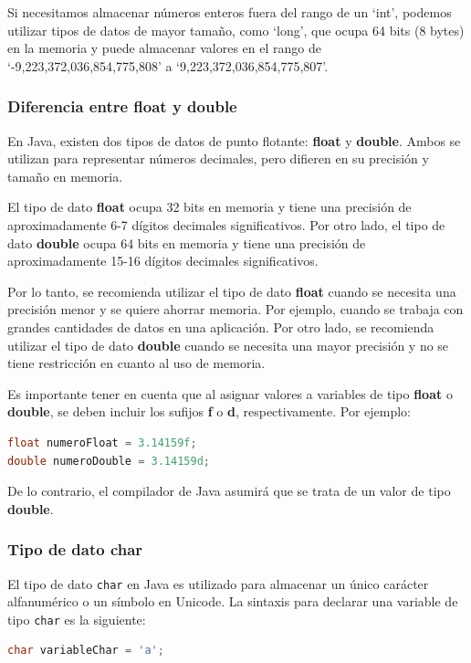 \documentclass[executivepaper]{article}
\begin{document}
Si necesitamos almacenar números enteros fuera del rango de un \enquote*{int}, podemos utilizar tipos de datos de mayor tamaño, como \enquote*{long}, que ocupa 64 bits (8 bytes) en la memoria y puede almacenar valores en el rango de \enquote*{-9,223,372,036,854,775,808} a \enquote*{9,223,372,036,854,775,807}.

\subsubsection*{Diferencia entre float y double}
En Java, existen dos tipos de datos de punto flotante: \textbf{float} y \textbf{double}. Ambos se utilizan para representar números decimales, pero difieren en su precisión y tamaño en memoria.

El tipo de dato \textbf{float} ocupa 32 bits en memoria y tiene una precisión de aproximadamente 6-7 dígitos decimales significativos. Por otro lado, el tipo de dato \textbf{double} ocupa 64 bits en memoria y tiene una precisión de aproximadamente 15-16 dígitos decimales significativos.

Por lo tanto, se recomienda utilizar el tipo de dato \textbf{float} cuando se necesita una precisión menor y se quiere ahorrar memoria. Por ejemplo, cuando se trabaja con grandes cantidades de datos en una aplicación. Por otro lado, se recomienda utilizar el tipo de dato \textbf{double} cuando se necesita una mayor precisión y no se tiene restricción en cuanto al uso de memoria.

Es importante tener en cuenta que al asignar valores a variables de tipo \textbf{float} o \textbf{double}, se deben incluir los sufijos \textbf{f} o \textbf{d}, respectivamente. Por ejemplo:

\begin{lstlisting}[language=Java]
float numeroFloat = 3.14159f;
double numeroDouble = 3.14159d;
\end{lstlisting}

De lo contrario, el compilador de Java asumirá que se trata de un valor de tipo \textbf{double}.

\subsubsection*{Tipo de dato char}
El tipo de dato \lstinline{char} en Java es utilizado para almacenar un único carácter alfanumérico o un símbolo en Unicode. La sintaxis para declarar una variable de tipo \lstinline{char} es la siguiente:

\begin{lstlisting}[language=Java]
char variableChar = 'a';
\end{lstlisting}
\end{document}
